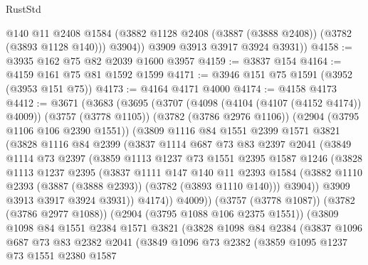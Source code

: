 \begin{lexlean}{RustStd}
\begin{coremodule}
            @140
            @11
            @2408
            @1584
            (@3882 @1128 @2408 (@3887 (@3888 @2408)) (@3782 (@3893 @1128 @140)))
            @3904))
        @3909
        @3913
        @3917
        @3924
        @3931))
@4158 := @3935 @162 @75 @82 @2039 @1600 @3957
@4159 := @3837 @154
@4164 := @4159 @161 @75 @81 @1592 @1599
@4171 := @3946 @151 @75 @1591 (@3952 (@3953 @151 @75))
@4173 := @4164 @4171 @4000
@4174 := @4158 @4173
@4412 := @3671
    (@3683
      (@3695
        (@3707
          (@4098 (@4104 (@4107 (@4152 @4174)) @4009))
          (@3757 (@3778 @1105))
          (@3782 (@3786 @2976 @1106))
          (@2904 (@3795 @1106 @106 @2390 @1551))
          (@3809
            @1116
            @84
            @1551
            @2399
            @1571
            @3821
            (@3828
              @1116
              @84
              @2399
              (@3837
                @1114
                @687
                @73
                @83
                @2397
                @2041
                (@3849
                  @1114
                  @73
                  @2397
                  (@3859
                    @1113
                    @1237
                    @73
                    @1551
                    @2395
                    @1587
                    @1246
                    (@3828
                      @1113
                      @1237
                      @2395
                      (@3837
                        @1111
                        @147
                        @140
                        @11
                        @2393
                        @1584
                        (@3882 @1110 @2393 (@3887 (@3888 @2393)) (@3782 (@3893 @1110 @140)))
                        @3904))
                    @3909
                    @3913
                    @3917
                    @3924
                    @3931))
                @4174))
            @4009))
        (@3757 (@3778 @1087))
        (@3782 (@3786 @2977 @1088))
        (@2904 (@3795 @1088 @106 @2375 @1551))
        (@3809
          @1098
          @84
          @1551
          @2384
          @1571
          @3821
          (@3828
            @1098
            @84
            @2384
            (@3837
              @1096
              @687
              @73
              @83
              @2382
              @2041
              (@3849
                @1096
                @73
                @2382
                (@3859
                  @1095
                  @1237
                  @73
                  @1551
                  @2380
                  @1587

\end{coremodule}
\end{lexlean}
